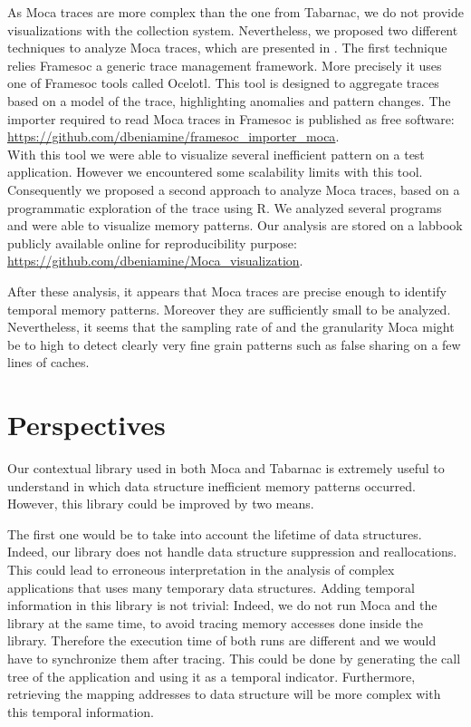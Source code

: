 As \gls{Moca} traces are more complex than the one from \gls{Tabarnac}, we do not provide visualizations with the collection system.
Nevertheless, we proposed two different techniques to analyze \gls{Moca} traces, which are presented in .
The first technique relies \gls{Framesoc} a generic trace management framework.
More precisely it uses one of \gls{Framesoc} tools called \gls{Ocelotl}.
This tool is designed to aggregate traces based on a model of the trace, highlighting anomalies and pattern changes.
The importer required to read \gls{Moca} traces in \gls{Framesoc} is published as free software:\\
\url{https://github.com/dbeniamine/framesoc\_importer\_moca}.\\
With this tool we were able to visualize several inefficient pattern on a test application.
However we encountered some scalability limits with this tool.
Consequently we proposed a second approach to analyze \gls{Moca} traces, based on a programmatic exploration of the trace using \gls{R}.
We analyzed several programs and were able to visualize memory patterns.
Our analysis are stored on a labbook publicly available online for reproducibility purpose:\\
\url{https://github.com/dbeniamine/Moca_visualization}.

After these analysis, it appears that \gls{Moca} traces are precise enough to identify temporal memory patterns.
Moreover they are sufficiently small to be analyzed.
Nevertheless, it seems that the sampling rate of and the granularity \gls{Moca} might be to high to detect clearly very fine grain patterns such as false sharing on a few lines of caches.

\section{Perspectives}

Our contextual library used in both \gls{Moca} and \gls{Tabarnac} is extremely useful to understand in which data structure inefficient memory patterns occurred.
However, this library could be improved by two means.

The first one would be to take into account the lifetime of data structures.
Indeed, our library does not handle data structure suppression and reallocations.
This could lead to erroneous interpretation in the analysis of complex applications that uses many temporary data structures.
Adding temporal information in this library is not trivial:
Indeed, we do not run \gls{Moca} and the library at the same time, to avoid tracing memory accesses done inside the library.
Therefore the execution time of both runs are different and we would have to synchronize them after tracing.
This could be done by generating the call tree of the application and using it as a temporal indicator.
Furthermore, retrieving the mapping addresses to data structure will be more complex with this temporal information.

